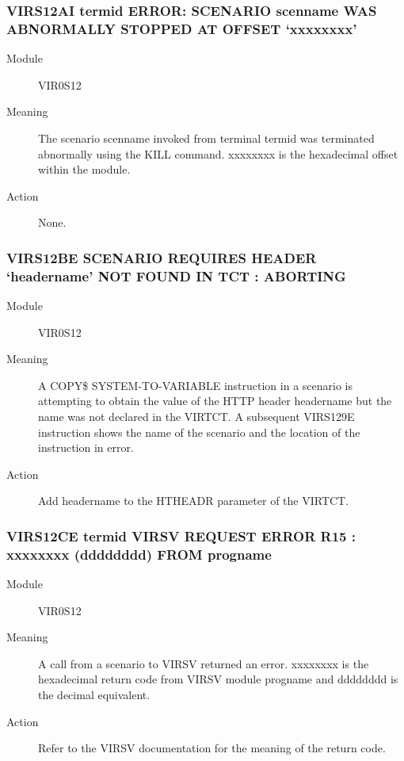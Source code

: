 \documentclass[letterpaper,10pt,english]{sphinxmanual}
\begin{document}
\subsubsection{VIRS12AI termid ERROR: SCENARIO scenname WAS ABNORMALLY STOPPED AT OFFSET ‘xxxxxxxx’}
\label{\detokenize{messages:virs12ai-termid-error-scenario-scenname-was-abnormally-stopped-at-offset-xxxxxxxx}}\begin{description}
\item[{Module}] \leavevmode
VIR0S12

\item[{Meaning}] \leavevmode
The scenario scenname invoked from terminal termid was terminated abnormally using the KILL command. xxxxxxxx is the hexadecimal offset within the module.

\item[{Action}] \leavevmode
None.

\end{description}


\subsubsection{VIRS12BE SCENARIO REQUIRES HEADER ‘headername’ NOT FOUND IN TCT : ABORTING}
\label{\detokenize{messages:virs12be-scenario-requires-header-headername-not-found-in-tct-aborting}}\begin{description}
\item[{Module}] \leavevmode
VIR0S12

\item[{Meaning}] \leavevmode
A COPY\$ SYSTEM-TO-VARIABLE instruction in a scenario is attempting to obtain the value of the HTTP header headername but the name was not declared in the VIRTCT. A subsequent VIRS129E instruction shows the name of the scenario and the location of the instruction in error.

\item[{Action}] \leavevmode
Add headername to the HTHEADR parameter of the VIRTCT.

\end{description}


\subsubsection{VIRS12CE termid VIRSV REQUEST ERROR \textendash{} R15 : xxxxxxxx (dddddddd) FROM progname}
\label{\detokenize{messages:virs12ce-termid-virsv-request-error-r15-xxxxxxxx-dddddddd-from-progname}}\begin{description}
\item[{Module}] \leavevmode
VIR0S12

\item[{Meaning}] \leavevmode
A call from a scenario to VIRSV returned an error. xxxxxxxx is the hexadecimal return code from VIRSV module progname and dddddddd is the decimal equivalent.

\item[{Action}] \leavevmode
Refer to the VIRSV documentation for the meaning of the return code.

\end{description}
\end{document}
